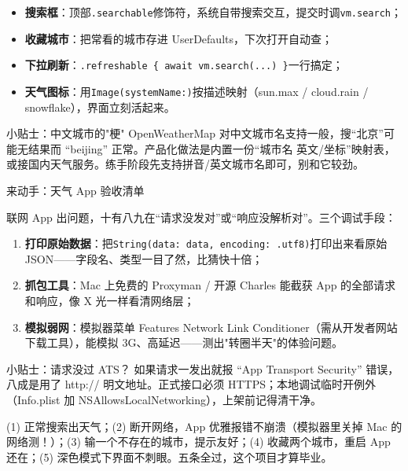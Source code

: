 
\begin{itemize}
  \item \textbf{搜索框}：顶部\texttt{.\allowbreak searchable}修饰符，系统自带搜索交互，提交时调\texttt{vm.\allowbreak search}；
  \item \textbf{收藏城市}：把常看的城市存进 UserDefaults，下次打开自动查；
  \item \textbf{下拉刷新}：\texttt{.\allowbreak refreshable \{ await vm.\allowbreak search(.\allowbreak .\allowbreak .\allowbreak ) \}}一行搞定；
  \item \textbf{天气图标}：用\texttt{Image(systemName:)}按描述映射（sun.max / cloud.rain / snowflake），界面立刻活起来。
\end{itemize}

\begin{tcbinfo}{小贴士：中文城市的"梗"}
OpenWeatherMap 对中文城市名支持一般，搜“北京”可能无结果而 “beijing” 正常。产品化做法是内置一份“城市名 英文/坐标”映射表，或接国内天气服务。练手阶段先支持拼音/英文城市名即可，别和它较劲。

\end{tcbinfo}

\begin{tcbpractice}{来动手：天气 App 验收清单}

联网 App 出问题，十有八九在“请求没发对”或“响应没解析对”。三个调试手段：

\begin{enumerate}
  \item \textbf{打印原始数据}：把\texttt{String(data: data, encoding: .\allowbreak utf8)}打印出来看原始 JSON——字段名、类型一目了然，比猜快十倍；
  \item \textbf{抓包工具}：Mac 上免费的 Proxyman / 开源 Charles 能截获 App 的全部请求和响应，像 X 光一样看清网络层；
  \item \textbf{模拟弱网}：模拟器菜单 Features Network Link Conditioner（需从开发者网站下载工具），能模拟 3G、高延迟——测出"转圈半天"的体验问题。
\end{enumerate}

\begin{tcbinfo}{小贴士：请求没过 ATS？}
如果请求一发出就报 “App Transport Security” 错误，八成是用了 http:// 明文地址。正式接口必须 HTTPS；本地调试临时开例外（Info.plist 加 NSAllowsLocalNetworking），上架前记得清干净。

\end{tcbinfo}

(1) 正常搜索出天气；(2) 断开网络，App 优雅报错不崩溃（模拟器里关掉 Mac 的网络测！）；(3) 输一个不存在的城市，提示友好；(4) 收藏两个城市，重启 App 还在；(5) 深色模式下界面不刺眼。五条全过，这个项目才算毕业。

\end{tcbpractice}

